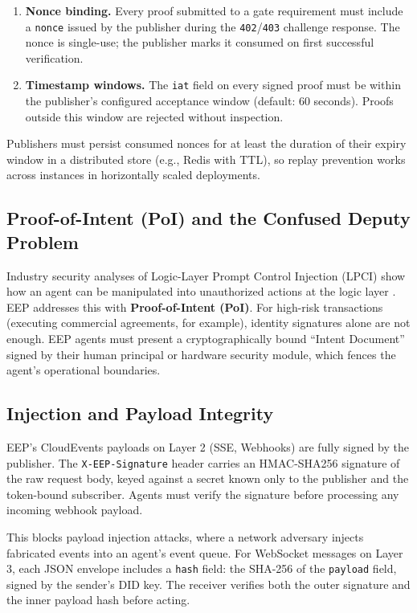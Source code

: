 \documentclass[12pt,a4paper]{article}
\begin{document}
\begin{enumerate}
    \item \textbf{Nonce binding.} Every proof submitted to a gate requirement must include a \texttt{nonce} issued by the publisher during the \texttt{402}/\texttt{403} challenge response. The nonce is single-use; the publisher marks it consumed on first successful verification.
    \item \textbf{Timestamp windows.} The \texttt{iat} field on every signed proof must be within the publisher's configured acceptance window (default: 60 seconds). Proofs outside this window are rejected without inspection.
\end{enumerate}

Publishers must persist consumed nonces for at least the duration of their expiry window in a distributed store (e.g., Redis with TTL), so replay prevention works across instances in horizontally scaled deployments.


\subsection{Proof-of-Intent (PoI) and the Confused Deputy Problem}

Industry security analyses of Logic-Layer Prompt Control Injection (LPCI) show how an agent can be manipulated into unauthorized actions at the logic layer \cite{ref32}. EEP addresses this with \textbf{Proof-of-Intent (PoI)}. For high-risk transactions (executing commercial agreements, for example), identity signatures alone are not enough. EEP agents must present a cryptographically bound ``Intent Document'' signed by their human principal or hardware security module, which fences the agent's operational boundaries.


\subsection{Injection and Payload Integrity}

EEP's CloudEvents payloads on Layer 2 (SSE, Webhooks) are fully signed by the publisher. The \texttt{X-EEP-Signature} header carries an HMAC-SHA256 signature of the raw request body, keyed against a secret known only to the publisher and the token-bound subscriber. Agents must verify the signature before processing any incoming webhook payload.

This blocks payload injection attacks, where a network adversary injects fabricated events into an agent's event queue. For WebSocket messages on Layer 3, each JSON envelope includes a \texttt{hash} field: the SHA-256 of the \texttt{payload} field, signed by the sender's DID key. The receiver verifies both the outer signature and the inner payload hash before acting.
\end{document}
